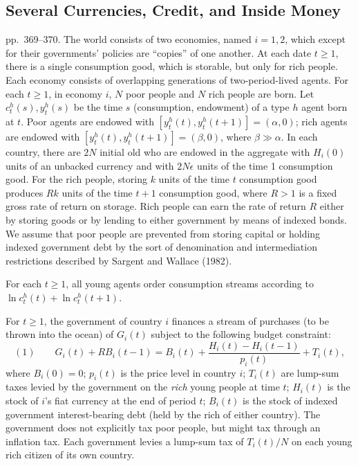 \documentclass[12pt, letterpaper]{article}
\begin{document}
\subsection{Several Currencies, Credit, and Inside Money}

\begin{tcolorbox}[evenbox,title={Exercise 9.6 \quad Exchange rate determinacy}]
\begin{tcolorbox}[questionbox]
pp.~369--370. The world consists of two economies, named $i=1,2$, which except for their
governments' policies are ``copies'' of one another. At each date $t\ge1$, there is a single
consumption good, which is storable, but only for rich people. Each economy consists of overlapping
generations of two-period-lived agents. For each $t\ge1$, in economy $i$, $N$ poor people and $N$
rich people are born. Let $c_t^h(s),y_t^h(s)$ be the time $s$ (consumption, endowment) of a type $h$
agent born at $t$. Poor agents are endowed with $[y_t^h(t),y_t^h(t+1)]=(\alpha,0)$; rich agents are
endowed with $[y_t^h(t),y_t^h(t+1)]=(\beta,0)$, where $\beta\gg\alpha$. In each country, there are
$2N$ initial old who are endowed in the aggregate with $H_i(0)$ units of an unbacked currency and
with $2N\epsilon$ units of the time 1 consumption good. For the rich people, storing $k$ units of the
time $t$ consumption good produces $Rk$ units of the time $t+1$ consumption good, where $R>1$ is a
fixed gross rate of return on storage. Rich people can earn the rate of return $R$ either by storing
goods or by lending to either government by means of indexed bonds. We assume that poor people are
prevented from storing capital or holding indexed government debt by the sort of denomination and
intermediation restrictions described by Sargent and Wallace (1982).

For each $t\ge1$, all young agents order consumption streams according to
$\ln c_t^h(t)+\ln c_t^h(t+1)$.

For $t\ge1$, the government of country $i$ finances a stream of purchases (to be thrown into the
ocean) of $G_i(t)$ subject to the following budget constraint:
\[
(1)\qquad G_i(t)+RB_i(t-1)=B_i(t)+\frac{H_i(t)-H_i(t-1)}{p_i(t)}+T_i(t),
\]
where $B_i(0)=0$; $p_i(t)$ is the price level in country $i$; $T_i(t)$ are lump-sum taxes levied by
the government on the \emph{rich} young people at time $t$; $H_i(t)$ is the stock of $i$'s fiat
currency at the end of period $t$; $B_i(t)$ is the stock of indexed government interest-bearing debt
(held by the rich of either country). The government does not explicitly tax poor people, but might
tax through an inflation tax. Each government levies a lump-sum tax of $T_i(t)/N$ on each young rich
citizen of its own country.


\end{tcolorbox}
\end{tcolorbox}
\end{document}
